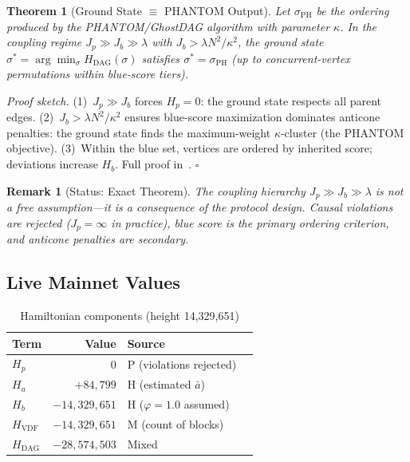 \documentclass[11pt,a4paper,twocolumn]{article}
\newtheorem{theorem}{Theorem}
\newtheorem{remark}{Remark}
\begin{document}
\begin{theorem}[Ground State $\equiv$ PHANTOM Output]
\label{thm:ground_state}
Let $\sigma_{\text{PH}}$ be the ordering produced by the PHANTOM/GhostDAG algorithm with parameter $\kappa$. In the coupling regime $J_p \gg J_b \gg \lambda$ with $J_b > \lambda N^2/\kappa^2$, the ground state $\sigma^* = \arg\min_\sigma H_{\text{DAG}}(\sigma)$ satisfies $\sigma^* = \sigma_{\text{PH}}$ (up to concurrent-vertex permutations within blue-score tiers).
\end{theorem}

\emph{Proof sketch.} (1)~$J_p \gg J_b$ forces $H_p = 0$: the ground state respects all parent edges. (2)~$J_b > \lambda N^2/\kappa^2$ ensures blue-score maximization dominates anticone penalties: the ground state finds the maximum-weight $\kappa$-cluster (the PHANTOM objective). (3)~Within the blue set, vertices are ordered by inherited score; deviations increase $H_b$. Full proof in~\cite{qnk-node-system}. \hfill $\square$

\begin{remark}[Status: \textcolor{measured}{Exact Theorem}]
The coupling hierarchy $J_p \gg J_b \gg \lambda$ is not a free assumption---it is a consequence of the protocol design. Causal violations are rejected ($J_p = \infty$ in practice), blue score is the primary ordering criterion, and anticone penalties are secondary.
\end{remark}

\subsection{Live Mainnet Values}

\begin{table}[H]
\centering
\caption{Hamiltonian components (height 14,329,651)}
\label{tab:hamiltonian}
\begin{tabular}{@{}lrll@{}}
\toprule
\textbf{Term} & \textbf{Value} & \textbf{Source} \\
\midrule
$H_p$           & $0$              & \textcolor{sectionblue}{P} (violations rejected) \\
$H_a$           & $+84{,}799$      & \textcolor{hardcoded}{H} (estimated $\bar{a}$) \\
$H_b$           & $-14{,}329{,}651$ & \textcolor{hardcoded}{H} ($\varphi=1.0$ assumed) \\
$H_{\text{VDF}}$ & $-14{,}329{,}651$ & \textcolor{measured}{M} (count of blocks) \\
\midrule
$H_{\text{DAG}}$ & $-28{,}574{,}503$ & Mixed \\
\bottomrule
\end{tabular}
\end{table}
\end{document}
